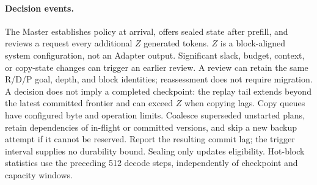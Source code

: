 \paragraph{Decision events.}
The Master establishes policy at arrival, offers sealed state after prefill,
and reviews a request every additional $Z$ generated tokens. $Z$ is a
block-aligned system configuration, not an Adapter output. Significant
slack, budget, context, or copy-state changes can trigger an earlier review.
A review can retain the same R/D/P goal, depth, and block identities;
reassessment does not require migration. A decision does not imply a
completed checkpoint: the replay tail extends
beyond the latest committed frontier and can exceed $Z$ when copying lags.
Copy queues have configured byte and operation limits. Coalesce superseded
unstarted plans, retain dependencies of in-flight or committed versions,
and skip a new backup attempt if it cannot be reserved. Report the resulting
commit lag; the trigger interval supplies no durability bound.
Sealing only updates eligibility. Hot-block statistics use the preceding
512 decode steps, independently of checkpoint and capacity windows.

